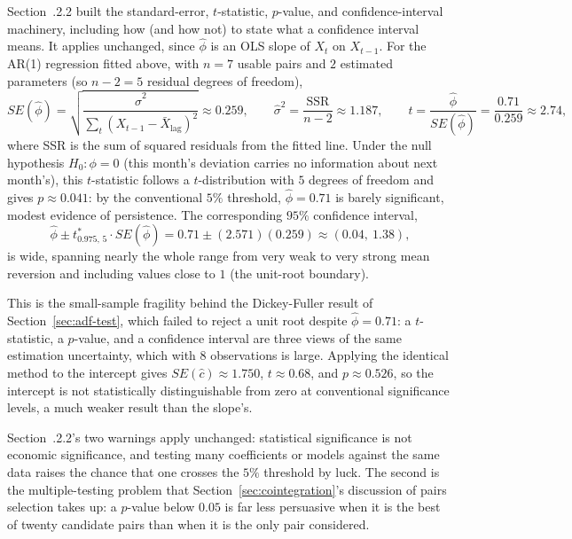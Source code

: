 \documentclass[../ai_in_finance]{subfiles}
\begin{document}
Section~.2.2 built the standard-error, $t$-statistic, $p$-value, and confidence-interval machinery, including how (and how not) to state what a confidence interval means. It applies unchanged, since $\hat\phi$ is an OLS slope of $X_t$ on $X_{t-1}$. For the AR(1) regression fitted above, with $n=7$ usable pairs and $2$ estimated parameters (so $n-2=5$ residual degrees of freedom),
\begin{equation*}
SE(\hat\phi) = \sqrt{\frac{\hat\sigma^2}{\sum_t (X_{t-1}-\bar X_{\text{lag}})^2}} \approx 0.259, \qquad \hat\sigma^2 = \frac{\text{SSR}}{n-2} \approx 1.187, \qquad t = \frac{\hat\phi}{SE(\hat\phi)} = \frac{0.71}{0.259} \approx 2.74,
\end{equation*}
where SSR is the sum of squared residuals from the fitted line. Under the null hypothesis $H_0: \phi = 0$ (this month's deviation carries no information about next month's), this $t$-statistic follows a $t$-distribution with $5$ degrees of freedom and gives $p \approx 0.041$: by the conventional $5\%$ threshold, $\hat\phi = 0.71$ is barely significant, modest evidence of persistence. The corresponding $95\%$ confidence interval,
\begin{equation*}
\hat\phi \pm t^*_{0.975,\,5}\cdot SE(\hat\phi) = 0.71 \pm (2.571)(0.259) \approx (0.04,\ 1.38),
\end{equation*}
is wide, spanning nearly the whole range from very weak to very strong mean reversion and including values close to $1$ (the unit-root boundary).

This is the small-sample fragility behind the Dickey-Fuller result of Section~\ref{sec:adf-test}, which failed to reject a unit root despite $\hat\phi = 0.71$: a $t$-statistic, a $p$-value, and a confidence interval are three views of the same estimation uncertainty, which with $8$ observations is large. Applying the identical method to the intercept gives $SE(\hat c) \approx 1.750$, $t \approx 0.68$, and $p \approx 0.526$, so the intercept is not statistically distinguishable from zero at conventional significance levels, a much weaker result than the slope's.

Section~.2.2's two warnings apply unchanged: statistical significance is not economic significance, and testing many coefficients or models against the same data raises the chance that one crosses the $5\%$ threshold by luck.
The second is the multiple-testing problem that Section~\ref{sec:cointegration}'s discussion of pairs selection takes up: a $p$-value below $0.05$ is far less persuasive when it is the best of twenty candidate pairs than when it is the only pair considered.
\end{document}
